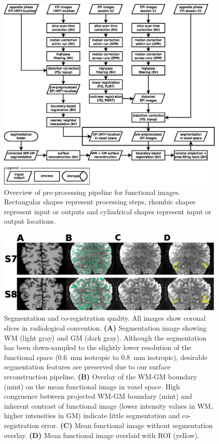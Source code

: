 \begin{figure}[htbp!]
\centering
\includegraphics[width=\textwidth]{figures/chapter_03_SI/figS11b.eps}
\caption{Overview of pre-processing pipeline for functional images. Rectangular shapes represent processing steps, rhombic shapes represent input or outputs and cylindrical shapes represent input or output locations.}
\label{fig:figB_proc}
\end{figure}

\begin{figure}[htbp!]
\centering
\includegraphics[width=\textwidth]{figures/chapter_03_SI/figS12.eps}
\caption{Segmentation and co-registration quality. All images show coronal slices in radiological convention. \textbf{(A)} Segmentation image showing WM (light gray) and GM (dark gray). Although the segmentation has been down-sampled to the slightly lower resolution of the functional space (0.6~mm isotropic to 0.8~mm isotropic), desirable segmentation features are preserved due to our surface reconstruction pipeline. \textbf{(B)} Overlay of the WM-GM boundary (mint) on the mean functional image in voxel space. High congruence between projected WM-GM boundary (mint) and inherent contrast of functional image (lower intensity values in WM, higher intensities in GM) indicate little segmentation and co-registration error. \textbf{(C)} Mean functional image without segmentation overlay. \textbf{(D)} Mean functional image overlaid with ROI (yellow).}
\label{fig:figC_segmQual}
\end{figure}

